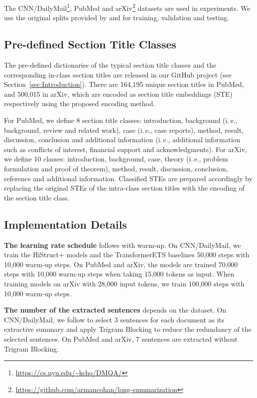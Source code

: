 \documentclass[11pt]{article}
\begin{document}
The CNN/DailyMail\footnote{\url{https://cs.nyu.edu/~kcho/DMQA/}}, PubMed and arXiv\footnote{\url{https://github.com/armancohan/long-summarization}} datasets are used in experiments. We use the original splits provided by \citet{cnndm} and \citet{pubmed} for training, validation and testing.

\subsection{Pre-defined Section Title Classes}
\label{subsec:Pre-defined section classes}


The pre-defined dictionaries of the typical section title classes and the corresponding in-class section titles are released in our GitHub project (see Section~\ref{sec:Introduction}). 
There are 164,195 unique section titles in PubMed, and 500,015 in arXiv, which are encoded as section title embeddings (STE) respectively using the proposed encoding method. 

For PubMed, we define 8 section title classes: introduction, background (i.\,e., background, review and related work), case (i.\,e., case reports), method, result, discussion, conclusion and additional information (i.\,e., additional information such as conflicts of interest, financial support and acknowledgments). For arXiv, we define 10 classes:  introduction, background, case, theory (i.\,e., problem formulation and proof of theorem), method, result, discussion, conclusion, reference and additional information. Classified STEs are prepared accordingly by replacing the original STEs of the intra-class section titles with the encoding of the section title class.

\subsection{Implementation Details}
\label{subsec:Implementation Details appendix}
\textbf{The learning rate schedule} follows \citet{presumm} with warm-up. On CNN/DailyMail, we train the HiStruct+ models and the TransformerETS baselines 50,000 steps with 10,000 warm-up steps. On PubMed and arXiv, the models are trained 70,000 steps with 10,000 warm-up steps when taking 15,000 tokens as input. When training models on arXiv with 28,000 input tokens, we train 100,000 steps with 10,000 warm-up steps. 

\textbf{The number of the extracted sentences} depends on the dataset. On CNN/DailyMail, we follow \citet{presumm} to select 3 sentences for each document as its extractive summary and apply Trigram Blocking \cite{paulus2018a} to reduce the redundancy of the selected sentences. On PubMed and arXiv, 7 sentences are extracted without Trigram Blocking.
\end{document}

